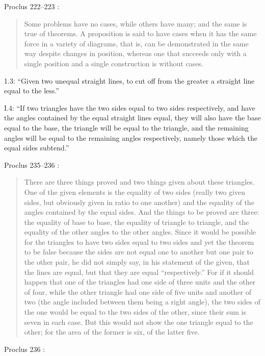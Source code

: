 \documentclass{article}
\begin{document}
Proclus 222--223 \cite[p.~174]{proclus}:

\begin{quote}
Some problems have no cases, while others have many;
and the same is true of theorems. A proposition is said to have
cases when it has the same force in a variety of diagrams,
that is, can be demonstrated in the same way despite changes
in position, whereas one that succeeds only with a single position
and a single construction is without cases.
\end{quote}

1.3: ``Given two unequal straight lines, to cut off from the 
greater a straight line equal to the less.''

I.4: ``If two triangles have the two sides equal to two sides
respectively, and have the angles contained by the equal straight
lines equal, they will also have the base equal to the base, the
triangle will be equal to the triangle, and the remaining angles
will be equal to the remaining angles respectively, namely those
which the equal sides subtend.''

Proclus 235--236 \cite[pp.~183--184]{proclus}:

\begin{quote}
There are three things proved and two things given about these triangles. One of the given elements
is the equality of two sides (really two given sides, but obviously given in ratio to one another) and the equality
of the angles contained by the equal sides. And the things to be proved are three: the
equality of  base to base, the equality of triangle to triangle,
and the equality of the other angles to the other angles.
Since it would be possible for the triangles to have two sides 
equal to two sides and yet the theorem to be false because the sides
are not equal one to another but one pair to the other pair,
he did not simply say, in his statement of the given, that
the lines are equal, but that they are equal ``respectively.'' For
if it should happen that one of the triangles had one side of
three units and the other of four, while the other triangle had
one side of five units and another of two (the angle included between them being
a right angle), the two sides of the one 
would be equal to the two sides of the other, since their sum
is seven in each case. But this would not show the one triangle
equal to the other; for the area of the former is six, of the latter five.
\end{quote}

Proclus 236 \cite[p.~184]{proclus}:
\end{document}
